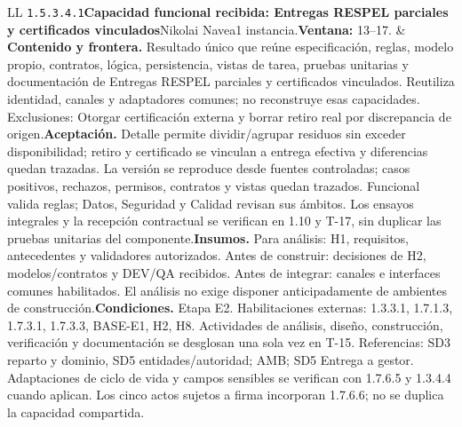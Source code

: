 \begin{longtable}{L{\tabcolsep\relax}L{\tabcolsep\relax}}
\texttt{1.\allowbreak{}5.\allowbreak{}3.\allowbreak{}4.\allowbreak{}1}\newline{}\textbf{Capacidad funcional recibida: Entregas RESPEL parciales y certificados vinculados}\newline{}Nikolai Navea\newline{}1 instancia.\newline{}\textbf{Ventana:} 13--17. & \textbf{Contenido y frontera.} Resultado único que reúne especificación, reglas, modelo propio, contratos, lógica, persistencia, vistas de tarea, pruebas unitarias y documentación de Entregas RESPEL parciales y certificados vinculados. Reutiliza identidad, canales y adaptadores comunes; no reconstruye esas capacidades. Exclusiones: Otorgar certificación externa y borrar retiro real por discrepancia de origen.\newline{}\textbf{Aceptación.} Detalle permite dividir/agrupar residuos sin exceder disponibilidad; retiro y certificado se vinculan a entrega efectiva y diferencias quedan trazadas. La versión se reproduce desde fuentes controladas; casos positivos, rechazos, permisos, contratos y vistas quedan trazados. Funcional valida reglas; Datos, Seguridad y Calidad revisan sus ámbitos. Los ensayos integrales y la recepción contractual se verifican en 1.10 y T-17, sin duplicar las pruebas unitarias del componente.\newline{}\textbf{Insumos.} Para análisis: H1, requisitos, antecedentes y validadores autorizados. Antes de construir: decisiones de H2, modelos/contratos y DEV/QA recibidos. Antes de integrar: canales e interfaces comunes habilitados. El análisis no exige disponer anticipadamente de ambientes de construcción.\newline{}\textbf{Condiciones.} Etapa E2. Habilitaciones externas: 1.3.3.1, 1.7.1.3, 1.7.3.1, 1.7.3.3, BASE-E1, H2, H8. Actividades de análisis, diseño, construcción, verificación y documentación se desglosan una sola vez en T-15. Referencias: SD3 reparto y dominio, SD5 entidades/autoridad; AMB; SD5 Entrega a gestor. Adaptaciones de ciclo de vida y campos sensibles se verifican con 1.7.6.5 y 1.3.4.4 cuando aplican. Los cinco actos sujetos a firma incorporan 1.7.6.6; no se duplica la capacidad compartida.\\\hline

\end{longtable}
